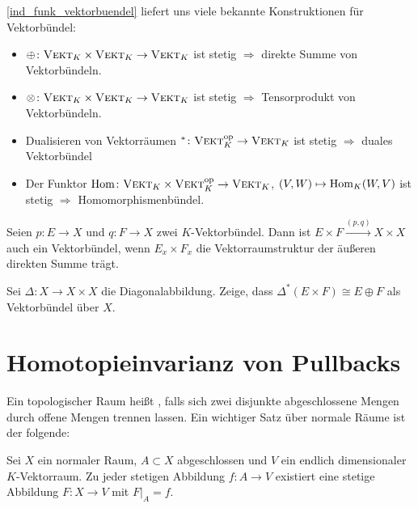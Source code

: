 \begin{beispiel}
\autoref{ind_funk_vektorbuendel} liefert uns viele bekannte Konstruktionen für Vektorbündel:
\begin{itemize}
	\item $\oplus \colon \textsc{Vekt}_K \times \textsc{Vekt}_K \to \textsc{Vekt}_K$ ist stetig $\Rightarrow $ direkte Summe von Vektorbündeln. 
	\item $\otimes \colon \textsc{Vekt}_K \times \textsc{Vekt}_K \to \textsc{Vekt}_K$ ist stetig $\Rightarrow $ Tensorprodukt von Vektorbündeln. 
	\item Dualisieren von Vektorräumen ${ }^* \colon \textsc{Vekt}_K^{\mathrm{op}} \to \textsc{Vekt}_K$ ist stetig $\Rightarrow $ duales Vektorbündel
	\item Der Funktor $\operatorname{Hom} \colon \textsc{Vekt}_K \times \textsc{Vekt}_K^{\mathrm{op}} \to \textsc{Vekt}_K$, $(V,W) \mapsto \operatorname{Hom}_K(W,V)$ ist stetig $\Rightarrow$ 
	Homomorphismenbündel.
\end{itemize}	
\end{beispiel}

\noindent Seien $p \colon E \to X$ und $q \colon F \to X$ zwei $K$-Vektorbündel. Dann ist $E \times F \xrightarrow{(p,q)} X \times X$ auch ein Vektorbündel, wenn 
$E_x\times F_x$ die Vektorraumstruktur der äußeren direkten Summe trägt.

\begin{uebung}
Sei $\Delta  \colon X \to X \times X$ die Diagonalabbildung. Zeige, dass $\Delta^*(E \times F) \cong E \oplus F$ als Vektorbündel über $X$.	
\end{uebung}



\section*{Homotopieinvarianz von Pullbacks}
\begin{erinnerung}
Ein topologischer Raum heißt , falls sich zwei disjunkte abgeschlossene Mengen durch offene Mengen trennen lassen. 	
Ein wichtiger Satz über normale Räume ist der folgende:
\end{erinnerung}

\begin{satz}[{name={Fortsetzungssatz von Tietze}},label=fort_tietze]
Sei $X$ ein normaler Raum, $A \subset X$ abgeschlossen und $V$ ein endlich dimensionaler $K$-Vektorraum. Zu jeder stetigen Abbildung $f \colon A \to V$ existiert eine 
stetige Abbildung $F \colon X \to V$ mit $F|_A=f$.
\end{satz}


